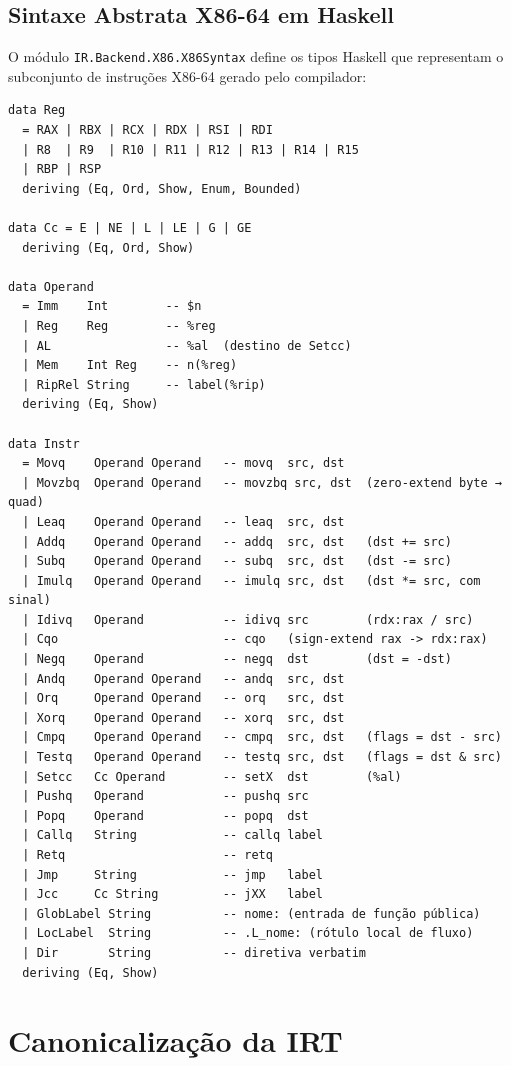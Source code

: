 \subsection{Sintaxe Abstrata X86-64 em Haskell}

O módulo \texttt{IR.Backend.X86.X86Syntax} define os tipos Haskell que
representam o subconjunto de instruções X86-64 gerado pelo compilador:

\begin{verbatim}
data Reg
  = RAX | RBX | RCX | RDX | RSI | RDI
  | R8  | R9  | R10 | R11 | R12 | R13 | R14 | R15
  | RBP | RSP
  deriving (Eq, Ord, Show, Enum, Bounded)

data Cc = E | NE | L | LE | G | GE
  deriving (Eq, Ord, Show)

data Operand
  = Imm    Int        -- $n
  | Reg    Reg        -- %reg
  | AL                -- %al  (destino de Setcc)
  | Mem    Int Reg    -- n(%reg)
  | RipRel String     -- label(%rip)
  deriving (Eq, Show)

data Instr
  = Movq    Operand Operand   -- movq  src, dst
  | Movzbq  Operand Operand   -- movzbq src, dst  (zero-extend byte → quad)
  | Leaq    Operand Operand   -- leaq  src, dst
  | Addq    Operand Operand   -- addq  src, dst   (dst += src)
  | Subq    Operand Operand   -- subq  src, dst   (dst -= src)
  | Imulq   Operand Operand   -- imulq src, dst   (dst *= src, com sinal)
  | Idivq   Operand           -- idivq src        (rdx:rax / src)
  | Cqo                       -- cqo   (sign-extend rax -> rdx:rax)
  | Negq    Operand           -- negq  dst        (dst = -dst)
  | Andq    Operand Operand   -- andq  src, dst
  | Orq     Operand Operand   -- orq   src, dst
  | Xorq    Operand Operand   -- xorq  src, dst
  | Cmpq    Operand Operand   -- cmpq  src, dst   (flags = dst - src)
  | Testq   Operand Operand   -- testq src, dst   (flags = dst & src)
  | Setcc   Cc Operand        -- setX  dst        (%al)
  | Pushq   Operand           -- pushq src
  | Popq    Operand           -- popq  dst
  | Callq   String            -- callq label
  | Retq                      -- retq
  | Jmp     String            -- jmp   label
  | Jcc     Cc String         -- jXX   label
  | GlobLabel String          -- nome: (entrada de função pública)
  | LocLabel  String          -- .L_nome: (rótulo local de fluxo)
  | Dir       String          -- diretiva verbatim
  deriving (Eq, Show)
\end{verbatim}

\section{Canonicalização da IRT}

